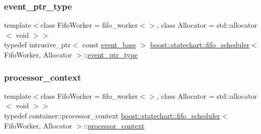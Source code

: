 \mbox{\label{classboost_1_1statechart_1_1fifo__scheduler_a30789ce36779246ebbaf43665289226a}} 
\subsubsection{\texorpdfstring{event\+\_\+ptr\+\_\+type}{event\_ptr\_type}}
{\footnotesize\ttfamily template$<$class Fifo\+Worker = fifo\+\_\+worker$<$$>$, class Allocator = std\+::allocator$<$ void $>$$>$ \\
typedef intrusive\+\_\+ptr$<$ const \mbox{\hyperlink{classboost_1_1statechart_1_1event__base}{event\+\_\+base}} $>$ \mbox{\hyperlink{classboost_1_1statechart_1_1fifo__scheduler}{boost\+::statechart\+::fifo\+\_\+scheduler}}$<$ Fifo\+Worker, Allocator $>$\+::\mbox{\hyperlink{classboost_1_1statechart_1_1fifo__scheduler_a30789ce36779246ebbaf43665289226a}{event\+\_\+ptr\+\_\+type}}}

\mbox{\label{classboost_1_1statechart_1_1fifo__scheduler_a7d1abb1c5cede2b8c42c59d76c301f5b}} 
\subsubsection{\texorpdfstring{processor\+\_\+context}{processor\_context}}
{\footnotesize\ttfamily template$<$class Fifo\+Worker = fifo\+\_\+worker$<$$>$, class Allocator = std\+::allocator$<$ void $>$$>$ \\
typedef container\+::processor\+\_\+context \mbox{\hyperlink{classboost_1_1statechart_1_1fifo__scheduler}{boost\+::statechart\+::fifo\+\_\+scheduler}}$<$ Fifo\+Worker, Allocator $>$\+::\mbox{\hyperlink{classboost_1_1statechart_1_1fifo__scheduler_a7d1abb1c5cede2b8c42c59d76c301f5b}{processor\+\_\+context}}}

\mbox{\label{classboost_1_1statechart_1_1fifo__scheduler_ada526939c16c4f8118bc4d7bbf09ad7d}} 

